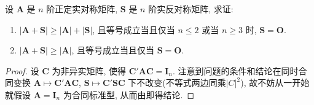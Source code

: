 \documentclass[../../main.tex]{subfiles}
\begin{document}
\begin{proposition}\label{proposition:A+S的行列式的相关结论}
设 \(\boldsymbol{A}\) 是 \(n\) 阶正定实对称矩阵, \(\boldsymbol{S}\) 是 \(n\) 阶实反对称矩阵, 求证:
\begin{enumerate}[(1)]
\item \(|\boldsymbol{A}+\boldsymbol{S}|\geq|\boldsymbol{A}|+|\boldsymbol{S}|\), 且等号成立当且仅当 \(n\leq2\) 或当 \(n\geq3\) 时, \(\boldsymbol{S}=\boldsymbol{O}\).
\item \(|\boldsymbol{A}+\boldsymbol{S}|\geq|\boldsymbol{A}|\), 且等号成立当且仅当 \(\boldsymbol{S}=\boldsymbol{O}\).
\end{enumerate}
\end{proposition}
\begin{proof}
设 \(\boldsymbol{C}\) 为非异实矩阵, 使得 \(\boldsymbol{C}'\boldsymbol{A}\boldsymbol{C}=\boldsymbol{I}_n\). 注意到问题的条件和结论在同时合同变换 \(\boldsymbol{A}\mapsto\boldsymbol{C}'\boldsymbol{A}\boldsymbol{C}\), \(\boldsymbol{S}\mapsto\boldsymbol{C}'\boldsymbol{S}\boldsymbol{C}\) 下不改变(不等式两边同乘$|C|^2$), 故不妨从一开始就假设 \(\boldsymbol{A}=\boldsymbol{I}_n\) 为合同标准型, 从而由即得结论. 
\end{proof}
\end{document}
